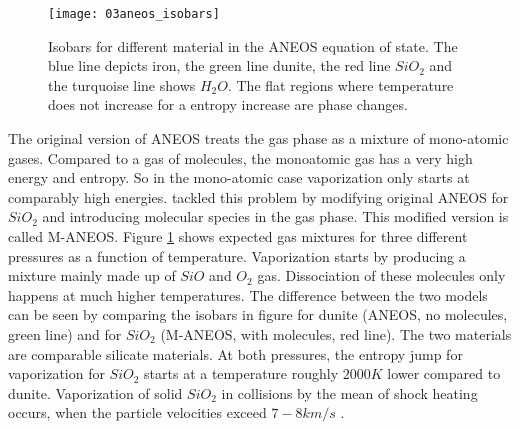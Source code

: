 \begin{figure}
\begin{center}
\texttt{[image: 03aneos\_isobars]}
\caption{Isobars for different material in the ANEOS equation of state. The blue line depicts iron, the green line dunite, the red line $SiO_2$ and the turquoise line shows $H_2 O$. The flat regions where temperature does not increase for a entropy increase are phase changes. }
\label{ch02_fig03}
\end{center}
\end{figure}

The original version of ANEOS treats the gas phase as a mixture of mono-atomic gases. Compared to a gas of molecules, the monoatomic gas has a very high energy and entropy. So in the mono-atomic case vaporization only starts at comparably high energies. \cite{Melosh:2007p3502} tackled this problem by modifying original ANEOS for $SiO_2$ and introducing molecular species in the gas phase. This modified version is called M-ANEOS. Figure \ref{ch02_fig03} shows expected gas mixtures for three different pressures as a function of temperature. Vaporization starts by producing a mixture mainly made up of $SiO$ and $O_2$ gas. Dissociation of these molecules only happens at much higher temperatures. The difference between the two models can be seen by comparing the isobars in figure for dunite (ANEOS, no molecules, green line) and for $SiO_2$ (M-ANEOS, with molecules, red line). The two materials are comparable silicate materials. At both pressures, the entropy jump for vaporization for $SiO_2$ starts at a temperature roughly $2000K$ lower compared to dunite. Vaporization of solid $SiO_2$ in collisions by the mean of shock heating occurs, when the particle velocities exceed $7-8km/s$ \citep{Melosh:2007p3502}.

